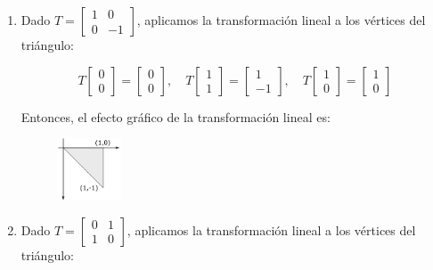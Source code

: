 \documentclass[12pt]{article}
\begin{document}
\begin{enumerate}[label=(\alph*)]
\item Dado $T = \begin{bmatrix}
                    1 &  0 \\
                    0 & -1
                \end{bmatrix}$, aplicamos la transformación lineal a los vértices del triángulo:

\begin{equation}
    T \begin{bmatrix}
        0 \\ 
        0
    \end{bmatrix} = \begin{bmatrix}
                        0 \\ 
                        0
                    \end{bmatrix} 
    ,\quad
    T \begin{bmatrix}
        1 \\ 
        1
    \end{bmatrix} = \begin{bmatrix}
                         1 \\ 
                        -1
                    \end{bmatrix}
    ,\quad
    T \begin{bmatrix}
        1 \\ 
        0
    \end{bmatrix} = \begin{bmatrix}
                         1 \\ 
                         0
                    \end{bmatrix}
\end{equation}

Entonces, el efecto gráfico de la transformación lineal es:

\begin{figure}[htbp]
    \centering
    \includegraphics[width=0.18\textwidth]{17b.png}
\end{figure}

\item Dado $T = \begin{bmatrix}
                     0 & 1 \\
                     1 & 0
                \end{bmatrix}$, aplicamos la transformación lineal a los vértices del triángulo:


\end{enumerate}
\end{document}
